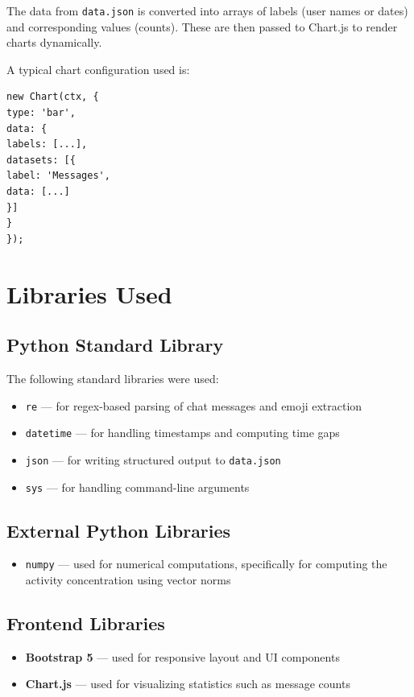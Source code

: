 \documentclass[12pt]{article}
\begin{document}
The data from \texttt{data.json} is converted into arrays of labels (user names or dates) and corresponding values (counts). These are then passed to Chart.js to render charts dynamically.

A typical chart configuration used is:

\begin{verbatim}
new Chart(ctx, {
type: 'bar',
data: {
labels: [...],
datasets: [{
label: 'Messages',
data: [...]
}]
}
});
\end{verbatim}

\section{Libraries Used}

\subsection{Python Standard Library}

The following standard libraries were used: \cite{python}

\begin{itemize}
\item \texttt{re} — for regex-based parsing of chat messages and emoji extraction
\item \texttt{datetime} — for handling timestamps and computing time gaps
\item \texttt{json} — for writing structured output to \texttt{data.json}
\item \texttt{sys} — for handling command-line arguments
\end{itemize}

\subsection{External Python Libraries}

\begin{itemize}
\item \texttt{numpy} — used for numerical computations, specifically for computing the activity concentration using vector norms \cite{numpy}
\end{itemize}

\subsection{Frontend Libraries}

\begin{itemize}
\item \textbf{Bootstrap 5} — used for responsive layout and UI components \cite{bootstrap}
\item \textbf{Chart.js} — used for visualizing statistics such as message counts \cite{chartjs}
\end{itemize}
\end{document}
